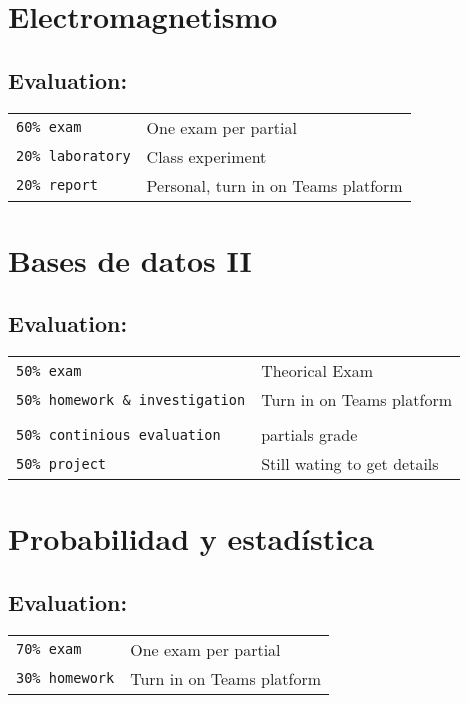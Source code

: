 \documentclass{article}
\begin{document}
    \section{Electromagnetismo}
        \subsection{Evaluation:}
        \begin{tabular}{ll}
            \texttt{60\% exam} & One exam per partial \\
            \texttt{20\% laboratory} &  Class experiment\\
            \texttt{20\% report} & Personal, turn in on Teams platform \\
        \end{tabular}


    \section{Bases de datos II}
        \subsection{Evaluation:}
        \begin{tabular}{ll}
            \texttt{50\% exam} & Theorical Exam \\
            \texttt{50\% homework \& investigation} & Turn in on Teams platform \\ \\

            \texttt{50\% continious evaluation} & partials grade \\
            \texttt{50\% project} & Still wating to get details \\
        \end{tabular}


    \section{Probabilidad y estadística}
        \subsection{Evaluation:}
        \begin{tabular}{ll}
            \texttt{70\% exam} & One exam per partial \\
            \texttt{30\% homework} & Turn in on Teams platform \\
        \end{tabular}
\end{document}
